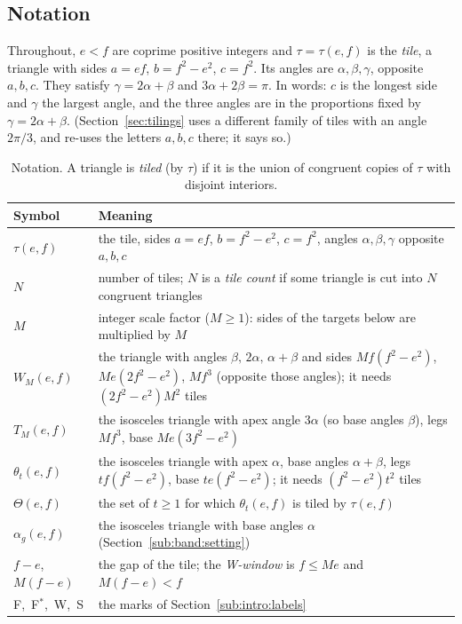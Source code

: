 \documentclass[11pt,reqno]{amsart}
\theoremstyle{plain}
\theoremstyle{definition}
\newcommand{\sF}{\textup{\textsf{F}}}
\newcommand{\sW}{\textup{\textsf{W}}}
\newcommand{\sS}{\textup{\textsf{S}}}
\begin{document}
\subsection{Notation}\label{sub:intro:notation}
Throughout, $e<f$ are coprime positive integers and $\tau=\tau(e,f)$ is the \emph{tile}, a triangle with sides
$a=ef$, $b=f^2-e^2$, $c=f^2$. Its angles are $\alpha,\beta,\gamma$, opposite $a,b,c$. They satisfy
$\gamma=2\alpha+\beta$ and $3\alpha+2\beta=\pi$. In words: $c$ is the longest side and $\gamma$ the largest angle, and the three angles are in the proportions fixed by
$\gamma=2\alpha+\beta$. (Section~\ref{sec:tilings} uses a different
family of tiles with an angle $2\pi/3$, and re-uses the letters $a,b,c$ there; it says so.)

\begin{table}[h]
\centering\small
\begin{tabular}{@{}p{3.1cm}p{9.6cm}@{}}
\hline
Symbol & Meaning\\\hline
$\tau(e,f)$ & the tile, sides $a=ef$, $b=f^2-e^2$, $c=f^2$, angles $\alpha,\beta,\gamma$ opposite $a,b,c$\\
$N$ & number of tiles; $N$ is a \emph{tile count} if some triangle is cut into $N$ congruent triangles\\
$M$ & integer scale factor ($M\ge1$): sides of the targets below are multiplied by $M$\\
$W_M(e,f)$ & the triangle with angles $\beta,\,2\alpha,\,\alpha+\beta$ and sides $Mf(f^2-e^2)$, $Me(2f^2-e^2)$, $Mf^3$ (opposite those angles); it needs $(2f^2-e^2)M^2$ tiles\\
$T_M(e,f)$ & the isosceles triangle with apex angle $3\alpha$ (so base angles $\beta$), legs $Mf^3$, base $Me(3f^2-e^2)$\\
$\theta_t(e,f)$ & the isosceles triangle with apex $\alpha$, base angles $\alpha+\beta$, legs $tf(f^2-e^2)$, base $te(f^2-e^2)$; it needs $(f^2-e^2)t^2$ tiles\\
$\Theta(e,f)$ & the set of $t\ge1$ for which $\theta_t(e,f)$ is tiled by $\tau(e,f)$\\
$\alpha_g(e,f)$ & the isosceles triangle with base angles $\alpha$ (Section~\ref{sub:band:setting})\\
$f-e$, $M(f-e)$ & the gap of the tile; the \emph{W-window} is $f\le Me$ and $M(f-e)<f$\\
\sF,\ \sF$^\ast$,\ \sW,\ \sS & the marks of Section~\ref{sub:intro:labels}\\\hline
\end{tabular}
\caption{Notation. A triangle is \emph{tiled} (by $\tau$) if it is the union of congruent copies of $\tau$ with disjoint interiors.}
\label{tab:notation}
\end{table}
\end{document}
